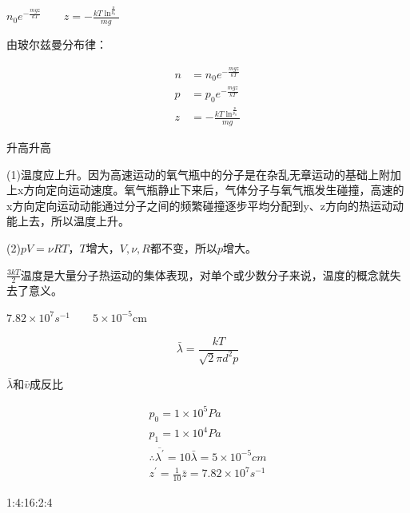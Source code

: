 $
n _ { 0 } e ^ { - \frac { m g z } { k T } }
\qquad
z = - \frac { k T \ln ^ { \frac { p } { p_0 } } } { m g }
$

\solve 由玻尔兹曼分布律：

$$
\begin{aligned} n & = n _ { 0 } e ^ { - \frac { m g z } { k T } } \\ p & = p _ { 0 } e ^ { - \frac { m g z } { k T } } \\ z & = - \frac { k T \ln ^ { \frac { p } { p _ { 0 } } } } { m g } \end{aligned}
$$

 升高\qquad 升高

\solve (1)温度应上升。因为高速运动的氧气瓶中的分子是在杂乱无章运动的基础上附加上x方向定向运动速度。氧气瓶静止下来后，气体分子与氧气瓶发生碰撞，高速的x方向定向运动动能通过分子之间的频繁碰撞逐步平均分配到y、z方向的热运动动能上去，所以温度上升。

(2)$pV=\nu RT$，$T$增大，$V,\nu,R$都不变，所以$p$增大。

$\frac{3kT}{2}$\qquad 温度是大量分子热运动的集体表现，对单个或少数分子来说，温度的概念就失去了意义。

$7.82 \times 10 ^ { 7 } s ^ { - 1 } \qquad5 \times 10 ^ { - 5 } \mathrm { cm }$

\solve

$$
\bar { \lambda } = \frac { k T } { \sqrt { 2 } \pi d ^ { 2 } p }
$$

$\bar { \lambda } $和$\bar { v } $成反比

$$
\begin{array} { l }
 { p _ { 0 } = 1 \times 10 ^ { 5 } P a } \\ { p _ { 1 } = 1 \times 10 ^ { 4 } P a } \\ { \therefore \overline { \lambda ^ { \prime } } = 10 \bar { \lambda } = 5 \times 10 ^ { - 5 } c m } \\ { z ^ { \prime } = \frac { 1 } { 10 } \bar { z } = 7.82 \times 10 ^ { 7 } s ^ { - 1 } }
\end{array}
$$

 1:4:16:2:4

\solve

